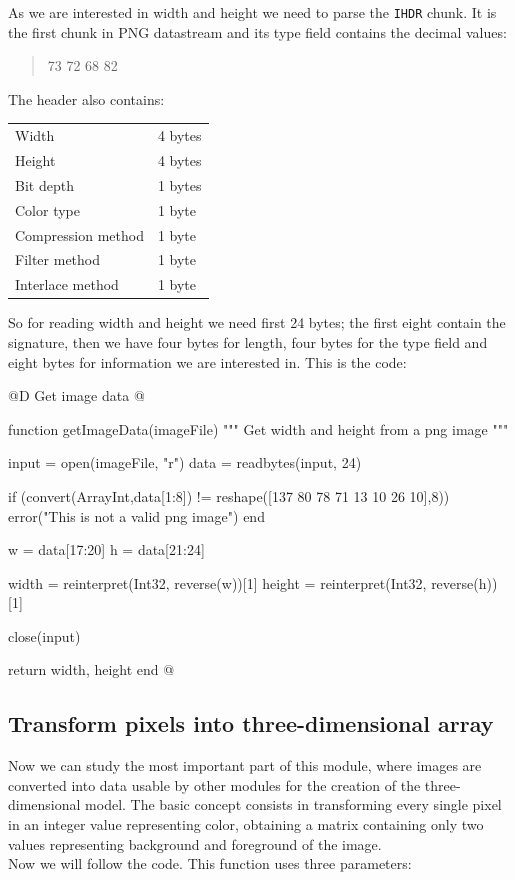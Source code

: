 \documentclass[11pt,oneside]{article}	%
\begin{document}
As we are interested in width and height we need to parse the \texttt{IHDR} chunk. It is the first chunk in PNG datastream and its type field contains the decimal values:

\begin{quote}
 73 72 68 82
\end{quote}

The header also contains:\\

\begin{tabular}{l l}
  Width & 4 bytes\\
  Height & 4 bytes\\
  Bit depth & 1 bytes\\
  Color type & 1 byte\\
  Compression method & 1 byte\\
  Filter method & 1 byte\\
  Interlace method & 1 byte\\
\end{tabular}
\newline

So for reading width and height we need first 24 bytes; the first eight contain the signature, then we have four bytes for length, four bytes for the type field and eight bytes for information we are interested in. This is the code:

@D Get image data
@{function getImageData(imageFile)
  """
  Get width and height from a png image
  """

  input = open(imageFile, "r")
  data = readbytes(input, 24)
  
  if (convert(Array{Int},data[1:8]) != reshape([137 80 78 71 13 10 26 10],8))
    error("This is not a valid png image")
  end

  w = data[17:20]
  h = data[21:24]

  width = reinterpret(Int32, reverse(w))[1]
  height = reinterpret(Int32, reverse(h))[1]

  close(input)

  return width, height
end
@}

\subsection{Transform pixels into three-dimensional array}\label{sec:transformation}

Now we can study the most important part of this module, where images are converted into data usable by other modules for the creation of the three-dimensional model. The basic concept consists in transforming every single pixel in an integer value representing color, obtaining a matrix containing only two values representing background and foreground of the image.\\
Now we will follow the code. This function uses three parameters:
\end{document}
